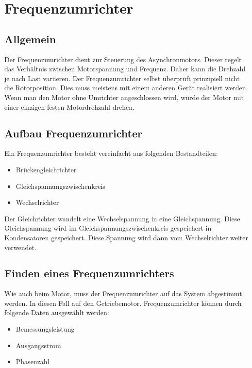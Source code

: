 \section{Frequenzumrichter}
\label{sec:frequenzumrichter}

\subsection{Allgemein}
\label{sec:allgemeinfrequenzumrichter}

Der Frequenzumrichter dient zur Steuerung des Asynchronmotors. Dieser regelt das Verhältnis zwischen Motorspannung und Frequenz. Daher kann die Drehzahl je  nach Last variieren. Der Frequenzumrichter selbst überprüft prinzipiell nicht die Rotorposition. Dies muss meistens mit einem anderen Gerät realisiert werden. Wenn man den Motor ohne Umrichter angeschlossen wird, würde der Motor mit einer einzigen festen Motordrehzahl drehen. 

\subsection{Aufbau Frequenzumrichter}
\label{sec:aufbauFrequenzumrichter}

Ein Frequenzumrichter besteht vereinfacht aus folgenden Bestandteilen:

\begin{itemize}
	\item{Brückengleichrichter}
	\item{Gleichspannungszwischenkreis}
	\item{Wechselrichter}
\end{itemize}

Der Gleichrichter wandelt eine Wechselspannung in eine Gleichspannung. Diese Gleichspannung wird im Gleichspannungszwischenkreis gespeichert in Kondensatoren gespeichert. Diese Spannung wird dann vom Wechselrichter weiter verwendet.

\subsection{Finden eines Frequenzumrichters}
\label{sec:findenEinesFrequenzumrichter}

Wie auch beim Motor, muss der Frequenzumrichter auf das System abgestimmt werden. In diesen Fall auf den Getriebemotor. Frequenzumrichter können durch folgende Daten ausgewählt werden:

\begin{itemize}
	\item{Bemessungsleistung}
	\item{Ausgangsstrom}
	\item{Phasenzahl}
\end{itemize}

